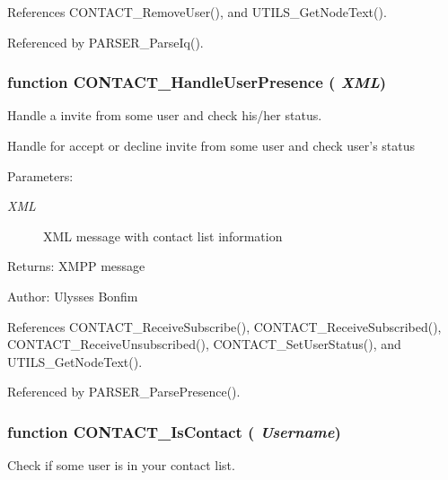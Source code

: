 References CONTACT\_\-RemoveUser(), and UTILS\_\-GetNodeText().

Referenced by PARSER\_\-ParseIq().
\subsubsection[CONTACT\_\-HandleUserPresence]{\setlength{\rightskip}{0pt plus 5cm}function CONTACT\_\-HandleUserPresence ( {\em XML})}\label{contact_2contact_8js_53500c8e9abf607022b79c6b131e2f39}


Handle a invite from some user and check his/her status. 

Handle for accept or decline invite from some user and check user's status

\begin{Desc}
\item[Parameters:]
\begin{description}
\item[{\em XML}]XML message with contact list information \end{description}
\end{Desc}
\begin{Desc}
\item[Returns:]XMPP message \end{Desc}
\begin{Desc}
\item[Author:]Ulysses Bonfim \end{Desc}


References CONTACT\_\-ReceiveSubscribe(), CONTACT\_\-ReceiveSubscribed(), CONTACT\_\-ReceiveUnsubscribed(), CONTACT\_\-SetUserStatus(), and UTILS\_\-GetNodeText().

Referenced by PARSER\_\-ParsePresence().
\subsubsection[CONTACT\_\-IsContact]{\setlength{\rightskip}{0pt plus 5cm}function CONTACT\_\-IsContact ( {\em Username})}\label{contact_2contact_8js_58060a52ad5f559c2f22fd7a21d5c678}


Check if some user is in your contact list. 

